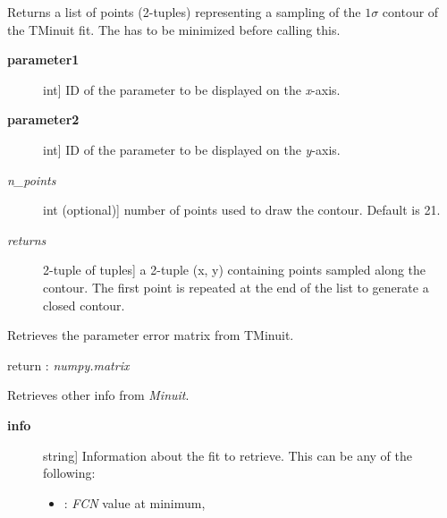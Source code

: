 \documentclass[a4paper,10pt,english]{sphinxmanual}
\begin{document}
\begin{fulllineitems}
\begin{fulllineitems}
\label{index:kafe.minuit.Minuit.get_contour}
Returns a list of points (2-tuples) representing a sampling of
the \(1\sigma\) contour of the TMinuit fit. The  has
to be minimized before calling this.
\begin{description}
\item[{\textbf{parameter1}}] \leavevmode{[}int{]}
ID of the parameter to be displayed on the \emph{x}-axis.

\item[{\textbf{parameter2}}] \leavevmode{[}int{]}
ID of the parameter to be displayed on the \emph{y}-axis.

\item[{\emph{n\_points}}] \leavevmode{[}int (optional){]}
number of points used to draw the contour. Default is 21.

\item[{\emph{returns}}] \leavevmode{[}2-tuple of tuples{]}
a 2-tuple (x, y) containing  points sampled
along the contour. The first point is repeated at the end
of the list to generate a closed contour.

\end{description}

\end{fulllineitems}


\begin{fulllineitems}
\label{index:kafe.minuit.Minuit.get_error_matrix}
Retrieves the parameter error matrix from TMinuit.

return : \emph{numpy.matrix}

\end{fulllineitems}


\begin{fulllineitems}
\label{index:kafe.minuit.Minuit.get_fit_info}
Retrieves other info from \emph{Minuit}.
\begin{description}
\item[{\textbf{info}}] \leavevmode{[}string{]}
Information about the fit to retrieve.
This can be any of the following:
\begin{itemize}
\item {} 
: \emph{FCN} value at minimum,


\end{itemize}
\end{description}
\end{fulllineitems}
\end{fulllineitems}
\end{document}
